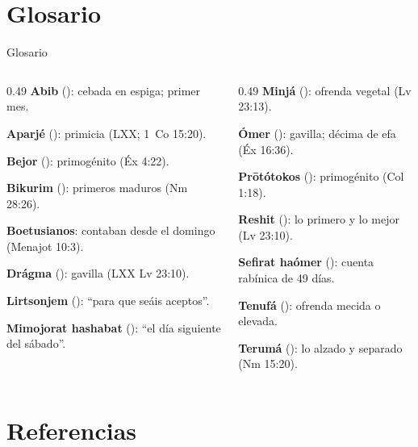 \section{Glosario}

\begin{frame}{Glosario}
\scriptsize
\begin{columns}[t,onlytextwidth]
\begin{column}{0.49\textwidth}\RaggedRight
\textbf{Abib} (): cebada en espiga; primer mes.\par
\textbf{Aparjé} (): primicia (LXX; 1~Co 15:20).\par
\textbf{Bejor} (): primogénito (Éx 4:22).\par
\textbf{Bikurim} (): primeros maduros (Nm 28:26).\par
\textbf{Boetusianos}: contaban desde el domingo (Menajot 10:3).\par
\textbf{Drágma} (): gavilla (LXX Lv 23:10).\par
\textbf{Lirtsonjem} (): ``para que seáis aceptos''.\par
\textbf{Mimojorat hashabat} (): ``el día siguiente del sábado''.
\end{column}
\begin{column}{0.49\textwidth}\RaggedRight
\textbf{Minjá} (): ofrenda vegetal (Lv 23:13).\par
\textbf{Ómer} (): gavilla; décima de efa (Éx 16:36).\par
\textbf{Prōtótokos} (): primogénito (Col 1:18).\par
\textbf{Reshit} (): lo primero y lo mejor (Lv 23:10).\par
\textbf{Sefirat haómer} (): cuenta rabínica de 49 días.\par
\textbf{Tenufá} (): ofrenda mecida o elevada.\par
\textbf{Terumá} (): lo alzado y separado (Nm 15:20).
\end{column}
\end{columns}
\end{frame}

\section{Referencias}

